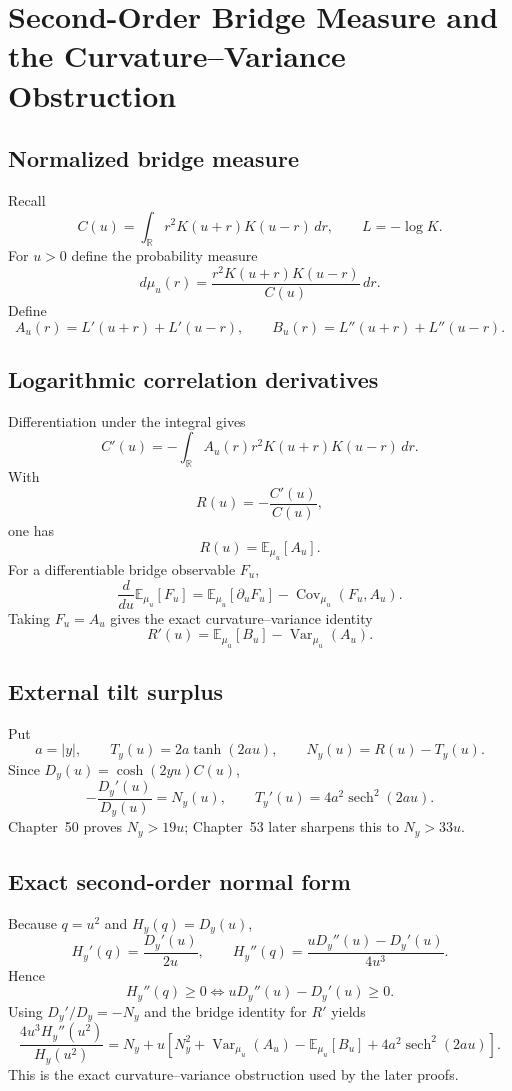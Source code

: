 \chapter{Second-Order Bridge Measure and the Curvature--Variance Obstruction}
\label{chap:g024-second-order-bridge}


\section{Normalized bridge measure}
Recall
\[
C(u)=\int_{\mathbb R}r^2K(u+r)K(u-r)\,dr,
\qquad L=-\log K.
\]
For $u>0$ define the probability measure
\[
\boxed{d\mu_u(r)=\frac{r^2K(u+r)K(u-r)}{C(u)}\,dr.}
\]
Define
\[
\boxed{A_u(r)=L'(u+r)+L'(u-r)},
\qquad
\boxed{B_u(r)=L''(u+r)+L''(u-r)}.
\]

\section{Logarithmic correlation derivatives}
Differentiation under the integral gives
\[
C'(u)=-\int_{\mathbb R}A_u(r)r^2K(u+r)K(u-r)\,dr.
\]
With
\[
R(u)=-\frac{C'(u)}{C(u)},
\]
one has
\[
\boxed{R(u)=\mathbb E_{\mu_u}[A_u].}
\]
For a differentiable bridge observable $F_u$,
\[
\frac{d}{du}\mathbb E_{\mu_u}[F_u]
=\mathbb E_{\mu_u}[\partial_uF_u]-\operatorname{Cov}_{\mu_u}(F_u,A_u).
\]
Taking $F_u=A_u$ gives the exact curvature--variance identity
\[
\boxed{R'(u)=\mathbb E_{\mu_u}[B_u]-\operatorname{Var}_{\mu_u}(A_u).}
\]

\section{External tilt surplus}
Put
\[
a=|y|,\qquad T_y(u)=2a\tanh(2au),
\qquad\boxed{N_y(u)=R(u)-T_y(u)}.
\]
Since $D_y(u)=\cosh(2yu)C(u)$,
\[
\boxed{-\frac{D_y'(u)}{D_y(u)}=N_y(u)},
\qquad
\boxed{T_y'(u)=4a^2\operatorname{sech}^2(2au)}.
\]
Chapter~50 proves $N_y>19u$; Chapter~53 later sharpens this to $N_y>33u$.

\section{Exact second-order normal form}
Because $q=u^2$ and $H_y(q)=D_y(u)$,
\[
H_y'(q)=\frac{D_y'(u)}{2u},
\qquad
\boxed{H_y''(q)=\frac{uD_y''(u)-D_y'(u)}{4u^3}.}
\]
Hence
\[
\boxed{H_y''(q)\ge0\iff uD_y''(u)-D_y'(u)\ge0.}
\]
Using $D_y'/D_y=-N_y$ and the bridge identity for $R'$ yields
\[
\boxed{
\frac{4u^3H_y''(u^2)}{H_y(u^2)}
=N_y+u\left[N_y^2+\operatorname{Var}_{\mu_u}(A_u)-\mathbb E_{\mu_u}[B_u]+4a^2\operatorname{sech}^2(2au)\right].
}
\]
This is the exact curvature--variance obstruction used by the later proofs.

